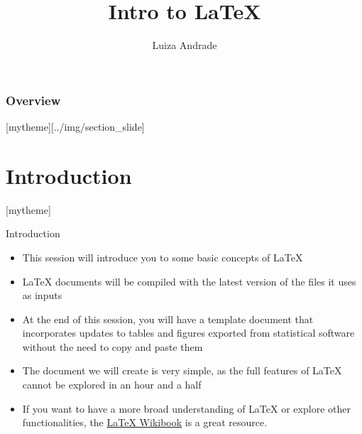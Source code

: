 \documentclass[aspectratio=169]{beamer}
\title{Intro to {\LaTeX}}
\date{}
\author{Luiza Andrade} %
\institute{Development Impact Evaluation (DIME) \newline The World Bank }
\newcommand{\sectionpic}[2]{
	\setbeamertemplate{section page}[mytheme][#2]
	\section{#1}
	\setbeamertemplate{section page}[mytheme]
}
\begin{document}
	
	
	{
		\maketitle
	}

\begin{frame}
	\frametitle{Overview} %
	\tableofcontents %
\end{frame}

\sectionpic{Introduction}{../img/section_slide}

\begin{frame}{Introduction}
	\begin{itemize}
		\item This session will introduce you to some basic concepts of {\LaTeX}
		\item {\LaTeX} documents will be compiled with the latest version of the files it uses as inputs
		\item At the end of this session, you will have a template document that incorporates updates to tables and figures exported from statistical software without the need to copy and paste them
		\item The document we will create is very simple, as the full features of {\LaTeX} cannot be explored in an hour and a half
		\item If you want to have a more broad understanding of {\LaTeX} or explore other functionalities, the \textcolor{blue}{\href{https://en.wikibooks.org/wiki/LaTeX}{{\LaTeX} Wikibook}} is a great resource. 
	\end{itemize}
\end{frame}
\end{document}
